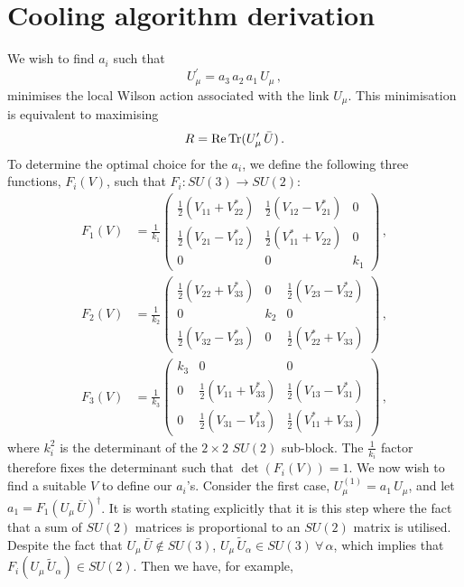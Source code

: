 \section{Cooling algorithm derivation}\label{app:Cooling}
We wish to find $a_i$ such that 
%
\begin{equation}
U_\mu^\prime = a_3 \, a_2 \, a_1 \, U_\mu\, ,
\label{eq:UPrime(app)}
\end{equation}
%
minimises the local Wilson action associated with the link $U_\mu$. This minimisation is equivalent to maximising
%
\begin{equation}
R = \operatorname{Re} \operatorname{Tr} (U_\mu^\prime \, \bar{U})\, .
\label{eq:CoolFunctional(app)}
\end{equation}
%
To determine the optimal choice for the $a_i$, we define the following three functions, $F_i(V)$, such that $F_i : SU(3)\rightarrow SU(2)$:
%
\begin{align*}
F_1(V) &=\frac{1}{k_1} \begin{pmatrix}
\frac{1}{2}\left(V_{11} + V_{22}^*\right) & \frac{1}{2}\left(V_{12} - V_{21}^*\right) & 0\\
\frac{1}{2}\left(V_{21} - V_{12}^*\right) & \frac{1}{2}\left(V_{11}^* + V_{22}\right) & 0\\
0 & 0 & k_1
\end{pmatrix}\, ,\\
F_2(V) &=\frac{1}{k_2} \begin{pmatrix}
\frac{1}{2}\left(V_{22} + V_{33}^*\right) & 0 &\frac{1}{2}\left(V_{23} - V_{32}^*\right)\\
0 & k_2 & 0\\
\frac{1}{2}\left(V_{32} - V_{23}^*\right) & 0 & \frac{1}{2}\left(V_{22}^* + V_{33}\right)
\end{pmatrix}\, ,\\
F_3(V) &=\frac{1}{k_3} \begin{pmatrix}
k_3 & 0 & 0\\
0 & \frac{1}{2}\left(V_{11} + V_{33}^*\right) & \frac{1}{2}\left(V_{13} - V_{31}^*\right)\\
0 & \frac{1}{2}\left(V_{31} - V_{13}^*\right) & \frac{1}{2}\left(V_{11}^* + V_{33}\right)
\end{pmatrix}\, ,
\end{align*}
%
where $k_i^2$ is the determinant of the $2\times 2$ $SU(2)$ sub-block. The $\frac{1}{k_i}$ factor therefore fixes the determinant such that $\det(F_i(V))=1$. We now wish to find a suitable $V$ to define our $a_i$'s. Consider the first case, $U^{(1)}_\mu = a_1\,U_\mu$, and let $a_1 = F_1(U_\mu\,\bar{U})^\dagger$. It is worth stating explicitly that it is this step where the fact that a sum of $SU(2)$ matrices is proportional to an $SU(2)$ matrix is utilised. Despite the fact that $U_\mu\,\bar{U} \notin SU(3)$, $U_\mu \, \tilde{U}_\alpha\in SU(3)~\forall\, \alpha$, which implies that $F_i(U_\mu\, \tilde{U}_\alpha)\in SU(2)$. Then we have, for example,
